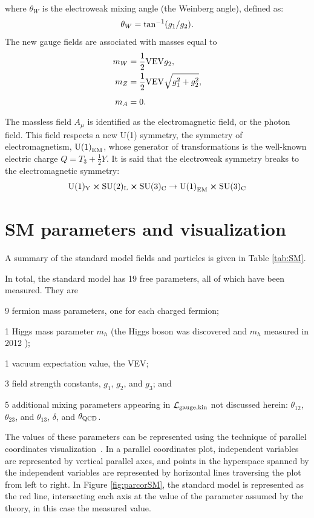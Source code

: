 where $\theta_W$ is the electroweak mixing angle (the Weinberg angle), defined as:
\begin{equation}
\theta_{W}={\rm tan}^{-1}(g_1/g_2).
\end{equation}
The new gauge fields are associated with masses equal to
\begin{align}
\vps m_{W} &= \frac{1}{2}{\rm VEV}g_{2}, \\
\vps m_{Z} &= \frac{1}{2}{\rm VEV}\sqrt{g_{1}^{2}+g_{2}^{2}},\\
\vps m_{A} &= 0.
\end{align}
The massless field $A_{\mu}$ is identified as the electromagnetic field, or the photon field. This field respects a new U(1) symmetry, the symmetry of electromagnetism, ${\rm U(1)}_{\rm EM}$, whose generator of transformations is the well-known electric charge $Q=T_3+\frac{1}{2}Y$. It is said that the electroweak symmetry breaks to the electromagnetic symmetry:
\begin{equation}
\rm U(1)_{Y}\cross\rm SU(2)_{L}\cross\rm SU(3)_{C}\rightarrow{\rm U(1)}_{\rm EM}\cross\rm SU(3)_{C}
\end{equation}

\section{SM parameters and visualization}
\label{sec:parcor}
A summary of the standard model fields and particles is given in Table \ref{tab:SM}.  

In total, the standard model has 19 free parameters, all of which have been measured. They are
\begin{itemize}
\item{9 fermion mass parameters, one for each charged fermion;}
\item{1 Higgs mass parameter $m_h$ (the Higgs boson was discovered and $m_h$ measured in 2012 \cite{Chatrchyan:2012xdj}); 
\item 1 vacuum expectation value, the VEV;}
\item{3 field strength constants, $g_1$, $g_2$, and $g_3$}; and
\item{5 additional mixing parameters appearing in $\mathcal{L}_{\rm gauge, kin}$ not discussed herein: $\theta_{12}$, $\theta_{23}$, and $\theta_{13}$, $\delta$, and $\theta_{\rm QCD}$.}
\end{itemize}
The values of these parameters can be represented using the technique of parallel coordinates visualization~\cite{bib:parcor}. In a parallel coordinates plot, independent variables are represented by vertical parallel axes, and points in the hyperspace spanned by the independent variables are represented by horizontal lines traversing the plot from left to right. In Figure \ref{fig:parcorSM}, the standard model is represented as the red line, intersecting each axis at the value of the parameter assumed by the theory, in this case the measured value.  

